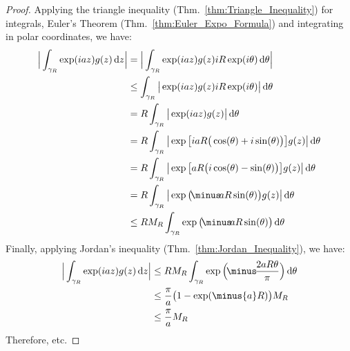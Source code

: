     \begin{proof}
        Applying the triangle inequality
        (Thm.~\ref{thm:Triangle_Inequality}) for integrals,
        Euler's Theorem (Thm.~\ref{thm:Euler_Expo_Formula}) and
        integrating in polar coordinates, we have:
        \begin{subequations}
            \begin{align}
                \Big|\int_{\gamma_{R}}\exp(iaz)g(z)\diff{z}\Big|
                &=\Big|\int_{\gamma_{R}}\exp(iaz)g(z)iR\exp(i\theta)
                    \diff{\theta}\Big|\\
                &\leq\int_{\gamma_{R}}\big|\exp(iaz)g(z)iR\exp(i\theta)
                    \big|\diff{\theta}\\
                &=R\int_{\gamma_{R}}\big|\exp(iaz)g(z)\big|\diff{\theta}\\
                &=R\int_{\gamma_{R}}\big|
                    \exp\big[iaR\big(\cos(\theta)+i\sin(\theta)\big)\big]
                    g(z)\big|\diff{\theta}\\
                &=R\int_{\gamma_{R}}\big|
                    \exp\big[aR\big(i\cos(\theta)-\sin(\theta)\big)\big]
                    g(z)\big|\diff{\theta}\\
                &=R\int_{\gamma_{R}}\big|
                    \exp\big(\!\minus\!aR\sin(\theta)\big)g(z)
                \big|\diff{\theta}\\
                &\leq{R}M_{R}\int_{\gamma_{R}}
                    \exp\big(\!\minus\!aR\sin(\theta)\big)\diff{\theta}
            \end{align}
        \end{subequations}
        Finally, applying Jordan's inequality
        (Thm.~\ref{thm:Jordan_Inequality}), we have:
        \begin{subequations}
            \begin{align}
                \Big|\int_{\gamma_{R}}\exp(iaz)g(z)\diff{z}\Big|
                &\leq{R}M_{R}\int_{\gamma_{R}}
                    \exp\Big(\!\minus\!\frac{2aR\theta}{\pi}\Big)
                \diff{\theta}\\
                &\leq\frac{\pi}{a}\big(1-\exp(\minus{a}R)\big)M_{R}\\
                &\leq\frac{\pi}{a}M_{R}
            \end{align}
        \end{subequations}
        Therefore, etc.
    \end{proof}
    \newpage
